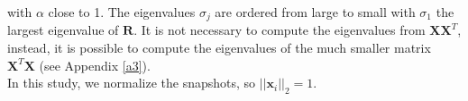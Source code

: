 \documentclass[review]{elsarticle}
\begin{document}
with $\alpha$ close to 1. The eigenvalues $\sigma_j$ are ordered from large to small with $\sigma_1$
the largest eigenvalue of $\mathbf{R}$. 
It is not necessary to compute the eigenvalues from $\mathbf{X}\mathbf{X}^T$, instead, it is possible to compute the eigenvalues of the much smaller matrix $\mathbf{X}^T\mathbf{X}$ (see Appendix \ref{a3}). \\
In this study, we normalize the snapshots, so $||\mathbf{x}_i||_2=1.$
\end{document}

